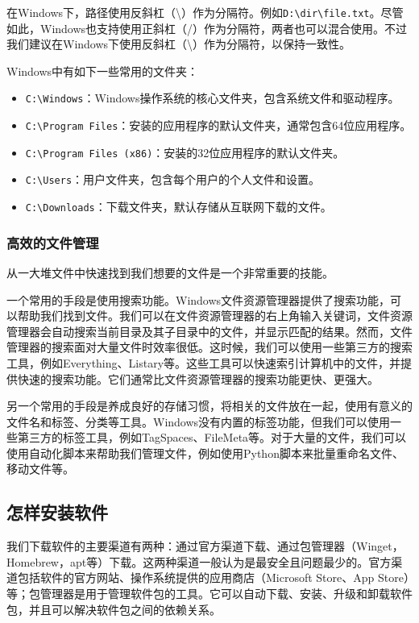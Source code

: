 \documentclass[../main.tex]{subfiles}
\begin{document}
在Windows下，路径使用反斜杠（\textbackslash）作为分隔符。例如\texttt{D:\textbackslash dir\textbackslash file.txt}。尽管如此，Windows也支持使用正斜杠（/）作为分隔符，两者也可以混合使用。不过我们建议在Windows下使用反斜杠（\textbackslash）作为分隔符，以保持一致性。

Windows中有如下一些常用的文件夹：
\begin{itemize}
  \item \texttt{C:\textbackslash Windows}：Windows操作系统的核心文件夹，包含系统文件和驱动程序。
  \item \texttt{C:\textbackslash Program Files}：安装的应用程序的默认文件夹，通常包含64位应用程序。
  \item \texttt{C:\textbackslash Program Files (x86)}：安装的32位应用程序的默认文件夹。
  \item \texttt{C:\textbackslash Users}：用户文件夹，包含每个用户的个人文件和设置。
  \item \texttt{C:\textbackslash Downloads}：下载文件夹，默认存储从互联网下载的文件。
\end{itemize}

\subsubsection{高效的文件管理}

从一大堆文件中快速找到我们想要的文件是一个非常重要的技能。

一个常用的手段是使用搜索功能。Windows文件资源管理器提供了搜索功能，可以帮助我们找到文件。我们可以在文件资源管理器的右上角输入关键词，文件资源管理器会自动搜索当前目录及其子目录中的文件，并显示匹配的结果。然而，文件管理器的搜索面对大量文件时效率很低。这时候，我们可以使用一些第三方的搜索工具，例如Everything、Listary等。这些工具可以快速索引计算机中的文件，并提供快速的搜索功能。它们通常比文件资源管理器的搜索功能更快、更强大。

另一个常用的手段是养成良好的存储习惯，将相关的文件放在一起，使用有意义的文件名和标签、分类等工具。Windows没有内置的标签功能，但我们可以使用一些第三方的标签工具，例如TagSpaces、FileMeta等。对于大量的文件，我们可以使用自动化脚本来帮助我们管理文件，例如使用Python脚本来批量重命名文件、移动文件等。

\subsection{怎样安装软件}

我们下载软件的主要渠道有两种：通过官方渠道下载、通过包管理器（Winget，Homebrew，apt等）下载。这两种渠道一般认为是最安全且问题最少的。官方渠道包括软件的官方网站、操作系统提供的应用商店（Microsoft Store、App Store）等；包管理器是用于管理软件包的工具。它可以自动下载、安装、升级和卸载软件包，并且可以解决软件包之间的依赖关系。
\end{document}
